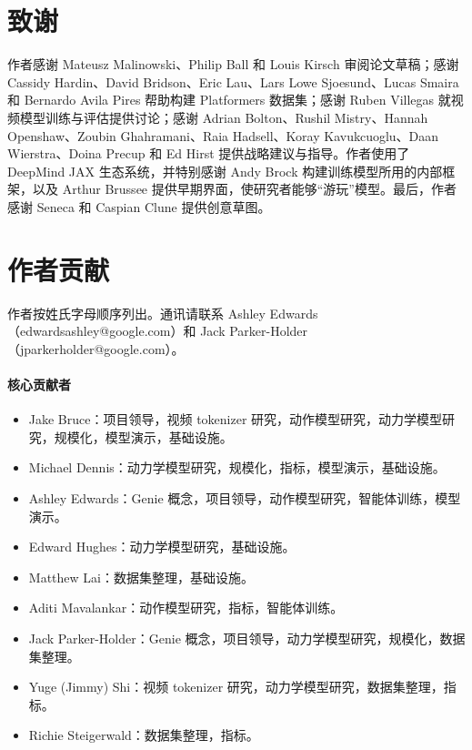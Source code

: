 \documentclass[10pt]{article}
\begin{document}
\section*{致谢}

作者感谢 Mateusz Malinowski、Philip Ball 和 Louis Kirsch 审阅论文草稿；感谢 Cassidy Hardin、David Bridson、Eric Lau、Lars Lowe Sjoesund、Lucas Smaira 和 Bernardo Avila Pires 帮助构建 Platformers 数据集；感谢 Ruben Villegas 就视频模型训练与评估提供讨论；感谢 Adrian Bolton、Rushil Mistry、Hannah Openshaw、Zoubin Ghahramani、Raia Hadsell、Koray Kavukcuoglu、Daan Wierstra、Doina Precup 和 Ed Hirst 提供战略建议与指导。作者使用了 DeepMind JAX 生态系统，并特别感谢 Andy Brock 构建训练模型所用的内部框架，以及 Arthur Brussee 提供早期界面，使研究者能够“游玩”模型。最后，作者感谢 Seneca 和 Caspian Clune 提供创意草图。

\section*{作者贡献}

作者按姓氏字母顺序列出。通讯请联系 Ashley Edwards（edwardsashley@google.com）和 Jack Parker-Holder（jparkerholder@google.com）。

\paragraph{核心贡献者}
\begin{itemize}
  \item Jake Bruce：项目领导，视频 tokenizer 研究，动作模型研究，动力学模型研究，规模化，模型演示，基础设施。
  \item Michael Dennis：动力学模型研究，规模化，指标，模型演示，基础设施。
  \item Ashley Edwards：Genie 概念，项目领导，动作模型研究，智能体训练，模型演示。
  \item Edward Hughes：动力学模型研究，基础设施。
  \item Matthew Lai：数据集整理，基础设施。
  \item Aditi Mavalankar：动作模型研究，指标，智能体训练。
  \item Jack Parker-Holder：Genie 概念，项目领导，动力学模型研究，规模化，数据集整理。
  \item Yuge (Jimmy) Shi：视频 tokenizer 研究，动力学模型研究，数据集整理，指标。
  \item Richie Steigerwald：数据集整理，指标。
\end{itemize}
\end{document}
